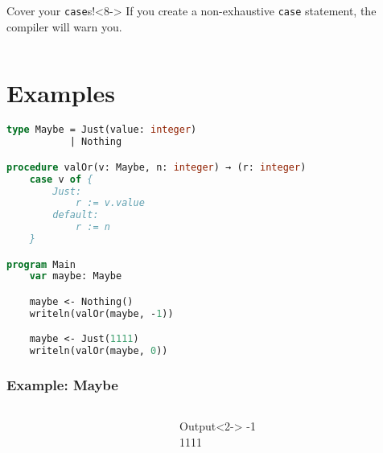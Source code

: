 \documentclass{beamer}
\begin{document}
\begin{frame}
\begin{columns}[T,onlytextwidth]
\begin{column}{.45\textwidth}
\begin{onlyenv}
\begin{minipage}{\textwidth}
                    \begin{alertblock}{\footnotesize Cover your \texttt{case}s!}<8->
                        {\footnotesize If you create a non-exhaustive \texttt{case} statement, the compiler will warn you.}
                    \end{alertblock}
                \end{minipage}
            \end{onlyenv}
        \end{column}
    \end{columns}
\end{frame}

\section{Examples}


\begin{lrbox}{\exampleMaybe}
\begin{lstlisting}[language=Pascal, basicstyle=\tiny]
type Maybe = Just(value: integer)
           | Nothing

procedure valOr(v: Maybe, n: integer) → (r: integer)
    case v of {
        Just:
            r := v.value
        default:
            r := n
    }

program Main
    var maybe: Maybe

    maybe <- Nothing()
    writeln(valOr(maybe, -1))

    maybe <- Just(1111)
    writeln(valOr(maybe, 0))


\end{lstlisting}
\end{lrbox}

\begin{frame}
\frametitle{Example: Maybe}

    \begin{columns}[T,onlytextwidth]
        \begin{column}{.6\textwidth}
            \begin{minipage}{\textwidth}
                \usebox{\exampleMaybe}
            \end{minipage}
        \end{column}
        \begin{column}{.35\textwidth}
            \begin{onlyenv}
                \begin{minipage}{\textwidth}
                    \begin{block}{Output}<2->
                        -1\\
                        1111
                    \end{block}
                \end{minipage}
            \end{onlyenv}
        \end{column}
    \end{columns}
\end{frame}
\end{document}
